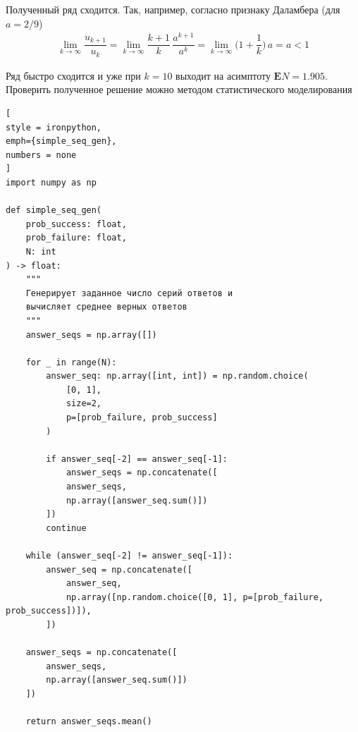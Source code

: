 \documentclass[%
	11pt,
	a4paper,
	utf8,
		]{article}
\begin{document}
Полученный ряд сходится. Так, например, согласно признаку Даламбера (для $ a = 2/9 $)
\begin{align*}
	\lim_{k \to \infty}\dfrac{u_{k+1}}{u_k} =\lim_{k \to \infty} \dfrac{k + 1}{k}\, \dfrac{a^{k+1}}{a^k} = \lim_{k \to \infty} \bigg( 1 + \dfrac{1}{k} \bigg) \, a = a < 1
\end{align*}

Ряд быстро сходится и уже при $ k=10 $ выходит на асимптоту $ \boxed{\mathbf{E}N = 1.905} $. Проверить полученное решение можно методом статистического моделирования 
\begin{lstlisting}[
style = ironpython,
emph={simple_seq_gen},
numbers = none
]
import numpy as np

def simple_seq_gen(
	prob_success: float,
	prob_failure: float,
	N: int
) -> float:
	"""
	Генерирует заданное число серий ответов и
	вычисляет среднее верных ответов
	"""
	answer_seqs = np.array([])

	for _ in range(N):
		answer_seq: np.array([int, int]) = np.random.choice(
			[0, 1],
			size=2,
			p=[prob_failure, prob_success]
		)

		if answer_seq[-2] == answer_seq[-1]:
			answer_seqs = np.concatenate([
			answer_seqs,
			np.array([answer_seq.sum()])
		])
		continue

	while (answer_seq[-2] != answer_seq[-1]):
		answer_seq = np.concatenate([
			answer_seq,
			np.array([np.random.choice([0, 1], p=[prob_failure, prob_success])]),
		])

	answer_seqs = np.concatenate([
		answer_seqs,
		np.array([answer_seq.sum()])
	])

	return answer_seqs.mean()
\end{lstlisting}




\listoffigures{}

\begin{thebibliography}{99}
	
	
	
	
	
\end{thebibliography}
\end{document}
